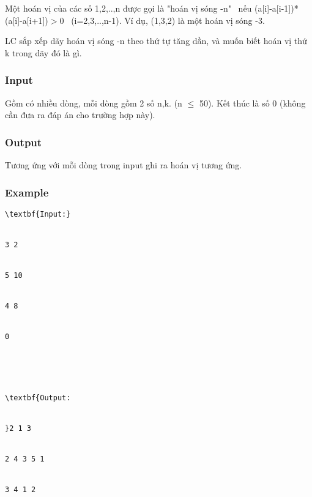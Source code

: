 



   Một hoán vị của các số 1,2,..,n được gọi là "hoán vị sóng -n"  nếu  (a[i]-a[i-1])*(a[i]-a[i+1])$>$0  (i=2,3,..,n-1). Ví dụ, (1,3,2) là một hoán vị sóng -3.  

   LC sắp xếp dãy hoán vị sóng -n theo thứ tự tăng dần, và muốn biết hoán vị thứ k trong dãy đó là gì.  

\subsubsection{   Input  }

   Gồm có nhiều dòng, mỗi dòng gồm 2 số n,k. (n $\le$ 50). Kết thúc là số 0 (không cần đưa ra đáp án cho trường hợp này).  

\subsubsection{   Output  }

   Tương ứng với mỗi dòng trong  input ghi ra hoán vị tương ứng.  

\subsubsection{   Example  }
\begin{verbatim}
\textbf{Input:}


3 2


5 10


4 8


0





\textbf{Output:


}2 1 3


2 4 3 5 1


3 4 1 2


\end{verbatim}
